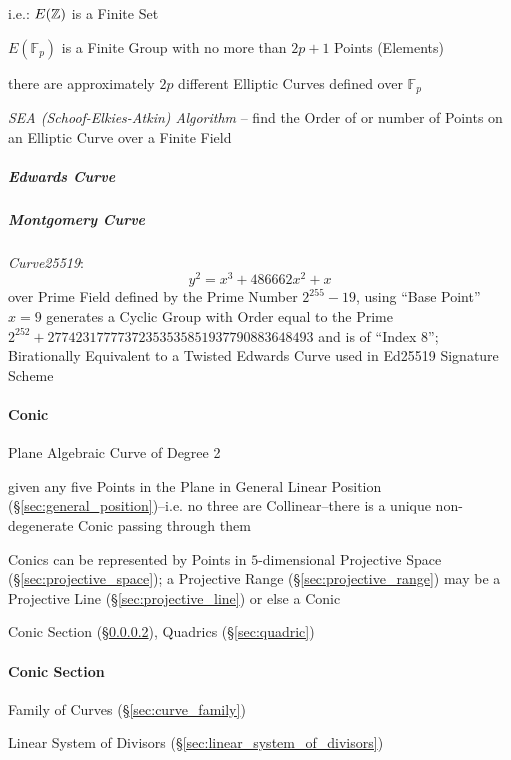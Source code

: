 i.e.: $E(\mathbb{Z})$ is a Finite Set

$E(\mathbb{F}_p)$ is a Finite Group with no more than $2p + 1$ Points (Elements)

there are approximately $2p$ different Elliptic Curves defined over
$\mathbb{F}_p$

\emph{SEA (Schoof-Elkies-Atkin) Algorithm} -- find the Order of or number of
Points on an Elliptic Curve over a Finite Field



\subparagraph{Edwards Curve}\label{sec:edwards_curve}\hfill

\subparagraph{Montgomery Curve}\label{sec:montgomery_curve}\hfill

\emph{Curve25519}:
\[
  y^2 = x^3 + 486662 x^2 + x
\]
over Prime Field defined by the Prime Number $2^255 - 19$, using ``Base Point''
$x = 9$ generates a Cyclic Group with Order equal to the Prime
$2^252 + 27742317777372353535851937790883648493$ and is of ``Index $8$'';
Birationally Equivalent to a Twisted Edwards Curve used in Ed25519 Signature
Scheme



\paragraph{Conic}\label{sec:conic}\hfill

Plane Algebraic Curve of Degree 2

given any five Points in the Plane in General Linear Position
(\S\ref{sec:general_position})--i.e. no three are Collinear--there is a unique
non-degenerate Conic passing through them

Conics can be represented by Points in $5$-dimensional Projective Space
(\S\ref{sec:projective_space}); a Projective Range
(\S\ref{sec:projective_range}) may be a Projective Line
(\S\ref{sec:projective_line}) or else a Conic

\fist Conic Section (\S\ref{sec:conic_section}), Quadrics (\S\ref{sec:quadric})



\paragraph{Conic Section}\label{sec:conic_section}\hfill

Family of Curves (\S\ref{sec:curve_family})

\fist Linear System of Divisors (\S\ref{sec:linear_system_of_divisors})




